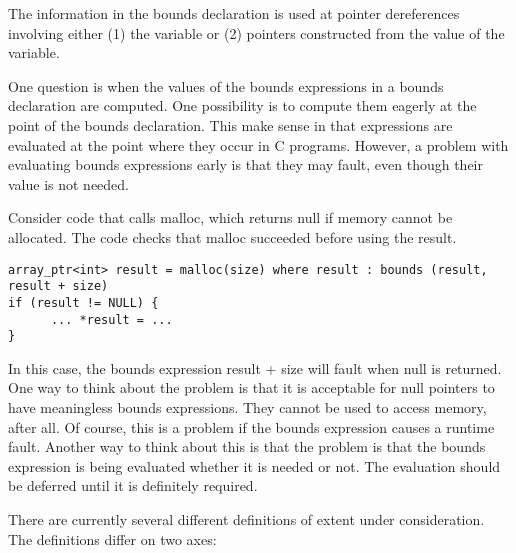 The information in the bounds declaration is used at pointer
dereferences involving either (1) the variable or (2) pointers
constructed from the value of the variable.

One question is when the values of the bounds expressions in a bounds
declaration are computed. One possibility is to compute them eagerly at
the point of the bounds declaration. This make sense in that expressions
are evaluated at the point where they occur in C programs. However, a
problem with evaluating bounds expressions early is that they may fault,
even though their value is not needed.

Consider code that calls malloc, which returns null if memory cannot be
allocated. The code checks that malloc succeeded before using the
result.
\begin{verbatim}
array_ptr<int> result = malloc(size) where result : bounds (result, result + size)
if (result != NULL) {
      ... *result = ...
}
\end{verbatim}

In this case, the bounds expression result + size will fault when null
is returned. One way to think about the problem is that it is acceptable
for null pointers to have meaningless bounds expressions. They cannot be
used to access memory, after all. Of course, this is a problem if the
bounds expression causes a runtime fault. Another way to think about
this is that the problem is that the bounds expression is being
evaluated whether it is needed or not. The evaluation should be deferred
until it is definitely required.

There are currently several different definitions of extent under
consideration. The definitions differ on two axes:

